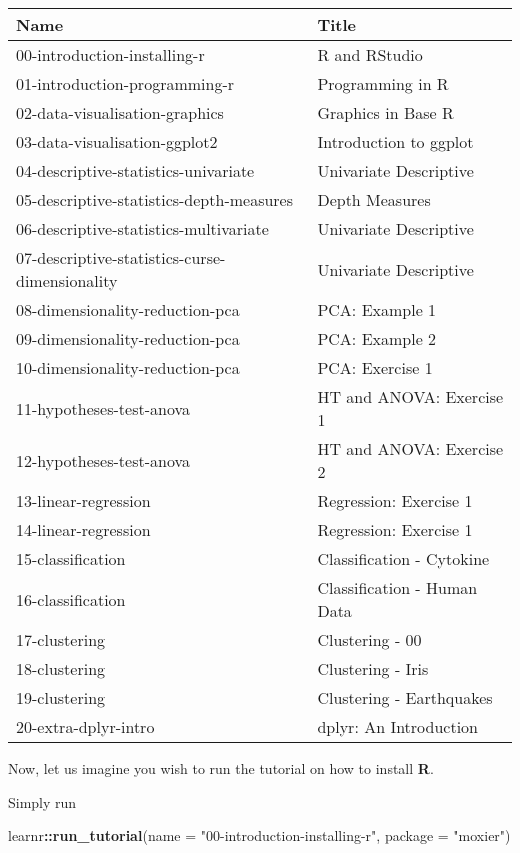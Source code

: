 \documentclass[]{book}
\newenvironment{Shaded}{\begin{snugshade}}{\end{snugshade}}
\newcommand{\KeywordTok}[1]{\textcolor[rgb]{0.13,0.29,0.53}{\textbf{#1}}}
\newcommand{\DataTypeTok}[1]{\textcolor[rgb]{0.13,0.29,0.53}{#1}}
\newcommand{\StringTok}[1]{\textcolor[rgb]{0.31,0.60,0.02}{#1}}
\newcommand{\OperatorTok}[1]{\textcolor[rgb]{0.81,0.36,0.00}{\textbf{#1}}}
\newcommand{\NormalTok}[1]{#1}
\begin{document}
\begin{tabular}{l|l}
\hline
Name & Title\\
\hline
00-introduction-installing-r & R and RStudio\\
\hline
01-introduction-programming-r & Programming in R\\
\hline
02-data-visualisation-graphics & Graphics in Base R\\
\hline
03-data-visualisation-ggplot2 & Introduction to ggplot\\
\hline
04-descriptive-statistics-univariate & Univariate Descriptive\\
\hline
05-descriptive-statistics-depth-measures & Depth Measures\\
\hline
06-descriptive-statistics-multivariate & Univariate Descriptive\\
\hline
07-descriptive-statistics-curse-dimensionality & Univariate Descriptive\\
\hline
08-dimensionality-reduction-pca & PCA: Example 1\\
\hline
09-dimensionality-reduction-pca & PCA: Example 2\\
\hline
10-dimensionality-reduction-pca & PCA: Exercise 1\\
\hline
11-hypotheses-test-anova & HT and ANOVA: Exercise 1\\
\hline
12-hypotheses-test-anova & HT and ANOVA: Exercise 2\\
\hline
13-linear-regression & Regression: Exercise 1\\
\hline
14-linear-regression & Regression: Exercise 1\\
\hline
15-classification & Classification - Cytokine\\
\hline
16-classification & Classification - Human Data\\
\hline
17-clustering & Clustering - 00\\
\hline
18-clustering & Clustering - Iris\\
\hline
19-clustering & Clustering - Earthquakes\\
\hline
20-extra-dplyr-intro & dplyr: An Introduction\\
\hline
\end{tabular}

Now, let us imagine you wish to run the tutorial on how to install
\textbf{R}.

Simply run

\begin{Shaded}
\begin{Highlighting}[]
\NormalTok{learnr}\OperatorTok{::}\KeywordTok{run_tutorial}\NormalTok{(}\DataTypeTok{name =} \StringTok{"00-introduction-installing-r"}\NormalTok{, }\DataTypeTok{package =} \StringTok{"moxier"}\NormalTok{)}
\end{Highlighting}
\end{Shaded}
\end{document}
